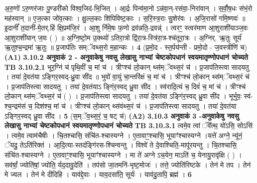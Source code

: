 \documentclass[17pt]{extarticle}
\begin{document}
{{{{{{{{{{{{{{{{{{{{{{                  अ॒रु॒णो॑ ऽरु॒णर॑जाः पु॒ण्डरी॑को विश्व॒जिद॑-भि॒जित् । आ॒र्द्रः पिन्व॑मा॒नो ऽन्न॑वा॒न्-रस॑वा॒-निरा॑वान् । स॒र्वौ॒ष॒धः स॑भं॒रो मह॑स्वान् ॥ ए॒ज॒त्का जो॑व॒त्काः । क्षु॒ल्ल॒काः शि॑पिविष्ट॒काः । स॒रि॒स्त्र॒राः सु॒शेर॑वः । अ॒जि॒रासो॑ गमि॒ष्णवः॑ ॥ इ॒दानीं᳚ त॒दानी॑-मे॒तर्.हि॑ क्षि॒प्रम॑जि॒रं । आ॒शु र्नि॑मे॒षः फ॒णो द्रव॑न्नति॒-द्रवन्न्॑ । त्वरꣳ॒॒ स्त्वर॑माण आ॒शुराशी॑याञ्ज॒वः {आ॒शुराशी॑यान् ज॒वः} ( ) ॥ अ॒ग्नि॒ष्टो॒म उ॒क्थ्यो॑ ऽतिरा॒त्रो द्वि॑रा॒त्र-स्त्रि॑रा॒त्र-श्च॑तूरा॒त्रः । अ॒ग्निर्. ऋ॒तुः सूर्य॑ ऋ॒तुश्च॒न्द्रमा॑ ऋ॒तुः ॥ प्र॒जाप॑तिः सम्ॅवथ्स॒रो म॒हान्कः । \textbf{ 4} \newline
                  \newline
                                    (प्र॒मो॒द - स्त॒र्पय॑न्ती - प्रमो॒दो - ज॒वस्त्रीणि॑ च) \textbf{(A1)} \newline \newline
                \textbf{ 3.10.2    अनुवाकं   2 - अनुवाकेषु नवसु लेखासु नाभ्यां चेष्टकोपधानं स्वयमातृण्णोपधानं चोच्यते} \newline
                                \textbf{ TB 3.10.2.1} \newline
                  भूर॒ग्निं च॑ पृथि॒वीं च॒ मां च॑ । त्रीꣳश्च॑ लो॒कान् थ्स॑म्ॅवथ्स॒रं च॑ । प्र॒जाप॑तिस्त्वा सादयतु । तया॑ दे॒वत॑या ऽङ्गिर॒स्वद्-ध्रु॒वा सी॑द ॥ भुवो॑ वा॒युं चा॒न्तरि॑क्षं च॒ मां च॑ । त्रीꣳश्च॑ लो॒कान् थ्स॑म्ॅवथ्स॒रं च॑ । प्र॒जाप॑तिस्त्वा सादयतु । तया॑ दे॒वत॑याऽ ङ्गिंर॒स्वद् ध्रु॒वा सी॑द । स्व॑रादि॒त्यं च॒ दिवं॑ च॒ मां च॑ । त्रीꣳश्च॑ लो॒कान् थ्स॑म्ॅवथ्स॒रं च॑ ( ) । प्र॒जाप॑तिस्त्वा सादयतु । तया॑ दे॒वत॑या ऽङ्गिंर॒स्वद् ध्रु॒वा सी॑द । भूर्भुवः॒ स्व॑-श्च॒न्द्रम॑सं च॒ दिश॑श्च॒ मां च॑ । त्रीꣳश्च॑ लो॒कान् थ्स॑वंथ्स॒रं च॑ । प्र॒जाप॑तिस्त्वा सादयतु । तया॑ दे॒वत॑या ऽङ्गिर॒स्वद् ध्रु॒वा सी॑द । \textbf{ 5} \newline
                  \newline
                                    (स॒म्ॅव॒थ्स॒रं॒ च॒ षट् च॑) \textbf{(A2)} \newline \newline
                \textbf{ 3.10.3    अनुवाकं   3 -अनुवाकेषु नवसु लेखासु नाभ्यां चेष्टकोपधानं स्वयमातृण्णोपधानं चोच्यते} \newline
                                \textbf{ TB 3.10.3.1} \newline
                  त्वमे॒व त्वां ॅवे᳚त्थ॒ यो॑ऽसि॒ सोऽसि॑ । त्वमे॒व त्वाम॑चैषीः । चि॒तश्चासि॒ संचि॑त-श्चास्यग्ने । ए॒तावाꣳ॒॒श्चासि॒ भूयाꣳ॑श्चास्यग्ने ।यत्ते॑ अग्ने॒ न्यू॑नं॒ ॅयदु॒ तेऽति॑रिक्तं । आ॒दि॒त्या-स्तदंङ्गि॑रस-श्चिन्वन्तु । विश्वे॑ ते दे॒वाश्चिति॒-मापू॑रयन्तु । चि॒तश्चासि॒ संचि॑त-श्चास्यग्ने । ए॒तावाꣳ॒॒श्चासि॒ भूयाꣳ॑श्चास्यग्ने । मा ते॑ अग्ने ऽच॒येन॒ माऽति॑ च॒ येनायु॒रावृ॑क्षि ( ) । सव॑र्षां॒ ज्योति॑षां॒ ज्योति॒ र्यद॒दावु॒देति॑ । तप॑सो जा॒तमनि॑-भृष्ट॒मोजः॑ । तत्ते॒ ज्योति॑रिष्टके । तेन॑ मे तप । तेन॑ मे ज्वल । तेन॑ मे दीदिहि । याव॑द्दे॒वाः । याव॒दसा॑ति॒ सूर्यः॑ । याव॑दु॒तापि॒ ब्रह्म॑ । \textbf{ 6} \newline
}}}}}}}}}}}}}}}}}}}}}}
\end{document}
